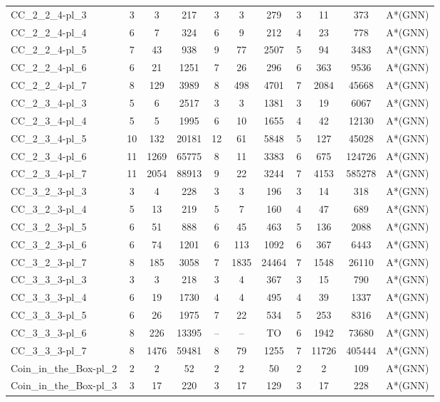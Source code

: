 \documentclass{article}
\newcommand{\unsolvedColumn}{--}
\newcommand{\myTO}{TO}
\begin{document}
\begin{longtable}[!ht]{l|ccc|ccc|cccc}
CC\_2\_2\_4-pl\_3 & 3 & 3 & 217 & 3 & 3 & 279 & 3 & 11 & 373 & A*(GNN) \\
CC\_2\_2\_4-pl\_4 & 6 & 7 & 324 & 6 & 9 & 212 & 4 & 23 & 778 & A*(GNN) \\
CC\_2\_2\_4-pl\_5 & 7 & 43 & 938 & 9 & 77 & 2507 & 5 & 94 & 3483 & A*(GNN) \\
CC\_2\_2\_4-pl\_6 & 6 & 21 & 1251 & 7 & 26 & 296 & 6 & 363 & 9536 & A*(GNN) \\
CC\_2\_2\_4-pl\_7 & 8 & 129 & 3989 & 8 & 498 & 4701 & 7 & 2084 & 45668 & A*(GNN) \\
CC\_2\_3\_4-pl\_3 & 5 & 6 & 2517 & 3 & 3 & 1381 & 3 & 19 & 6067 & A*(GNN) \\
CC\_2\_3\_4-pl\_4 & 5 & 5 & 1995 & 6 & 10 & 1655 & 4 & 42 & 12130 & A*(GNN) \\
CC\_2\_3\_4-pl\_5 & 10 & 132 & 20181 & 12 & 61 & 5848 & 5 & 127 & 45028 & A*(GNN) \\
CC\_2\_3\_4-pl\_6 & 11 & 1269 & 65775 & 8 & 11 & 3383 & 6 & 675 & 124726 & A*(GNN) \\
CC\_2\_3\_4-pl\_7 & 11 & 2054 & 88913 & 9 & 22 & 3244 & 7 & 4153 & 585278 & A*(GNN) \\
CC\_3\_2\_3-pl\_3 & 3 & 4 & 228 & 3 & 3 & 196 & 3 & 14 & 318 & A*(GNN) \\
CC\_3\_2\_3-pl\_4 & 5 & 13 & 219 & 5 & 7 & 160 & 4 & 47 & 689 & A*(GNN) \\
CC\_3\_2\_3-pl\_5 & 6 & 51 & 888 & 6 & 45 & 463 & 5 & 136 & 2088 & A*(GNN) \\
CC\_3\_2\_3-pl\_6 & 6 & 74 & 1201 & 6 & 113 & 1092 & 6 & 367 & 6443 & A*(GNN) \\
CC\_3\_2\_3-pl\_7 & 8 & 185 & 3058 & 7 & 1835 & 24464 & 7 & 1548 & 26110 & A*(GNN) \\
CC\_3\_3\_3-pl\_3 & 3 & 3 & 218 & 3 & 4 & 367 & 3 & 15 & 790 & A*(GNN) \\
CC\_3\_3\_3-pl\_4 & 6 & 19 & 1730 & 4 & 4 & 495 & 4 & 39 & 1337 & A*(GNN) \\
CC\_3\_3\_3-pl\_5 & 6 & 26 & 1975 & 7 & 22 & 534 & 5 & 253 & 8316 & A*(GNN) \\
CC\_3\_3\_3-pl\_6 & 8 & 226 & 13395 & \unsolvedColumn & \unsolvedColumn & \myTO & 6 & 1942 & 73680 & A*(GNN) \\
CC\_3\_3\_3-pl\_7 & 8 & 1476 & 59481 & 8 & 79 & 1255 & 7 & 11726 & 405444 & A*(GNN) \\
Coin\_in\_the\_Box-pl\_2 & 2 & 2 & 52 & 2 & 2 & 50 & 2 & 2 & 109 & A*(GNN) \\
Coin\_in\_the\_Box-pl\_3 & 3 & 17 & 220 & 3 & 17 & 129 & 3 & 17 & 228 & A*(GNN) \\

\end{longtable}
\end{document}
